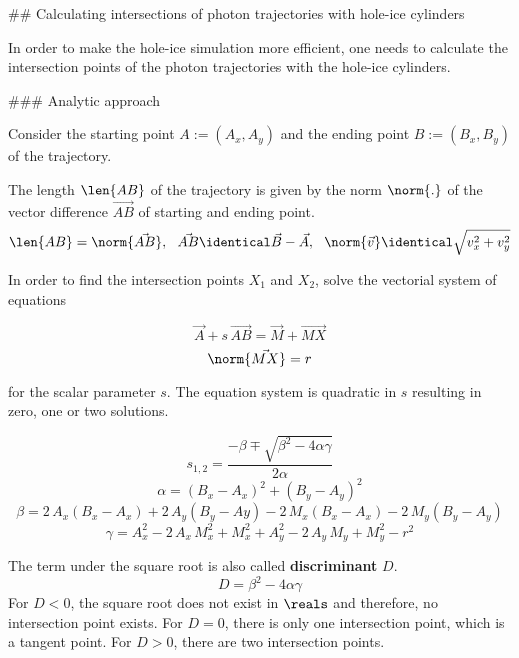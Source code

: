 
## Calculating intersections of photon trajectories with hole-ice cylinders

In order to make the hole-ice simulation more efficient, one needs to calculate the intersection points of the photon trajectories with the hole-ice cylinders.



### Analytic approach

Consider the starting point $A := (A_x, A_y)$ and the ending point $B := (B_x, B_y)$ of the trajectory.

The length $\len{AB}$ of the trajectory is given by the norm $\norm{.}$ of the vector difference $\vec{AB}$ of starting and ending point.
\begin{equation} \notag
  \len{AB} = \norm{\vec{AB}}, \ \ \vec{AB} \identical \vec{B} - \vec{A}, \ \ \norm{\vec{v}} \identical \sqrt{v_x^2 + v_y^2}
\end{equation}

In order to find the intersection points $X_1$ and $X_2$, solve the vectorial system of equations

\begin{equation}
  \vec{A} + s \, \vec{AB} = \vec{M} + \vec{MX}
\end{equation}
\begin{equation}
  \norm{\vec{MX}} = r
\end{equation}

for the scalar parameter $s$. The equation system is quadratic in $s$ resulting in zero, one or two solutions.

\begin{equation}
  s_{1,2} = \frac{-\beta \mp \sqrt{\beta^2 - 4\alpha\gamma}}{2\alpha}
\end{equation}
\begin{equation}
  \alpha = (B_x - A_x)^2 + (B_y - A_y)^2
\end{equation}
\begin{equation}
  \beta = 2\,A_x(B_x-A_x) + 2\,A_y(B_y-Ay) - 2\,M_x(B_x-A_x) - 2\,M_y(B_y-A_y)
\end{equation}
\begin{equation}
  \gamma = A_x^2 - 2\,A_x\,M_x^2 + M_x^2 + A_y^2 - 2\,A_y\,M_y + M_y^2 - r^2
\end{equation}

The term under the square root is also called \textbf{discriminant} $D$.
\begin{equation}
  D = \beta^2 - 4\alpha\gamma
\end{equation}
For $D < 0$, the square root does not exist in $\reals$ and therefore, no intersection point exists. For $D = 0$, there is only one intersection point, which is a tangent point. For $D > 0$, there are two intersection points.

